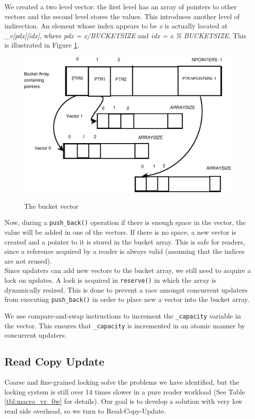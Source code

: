 \documentclass[a4paper,marginparwidth=50pt,marginparsep=10pt]{article}
\begin{document}
We created a two level vector: the first level has an array of pointers to other vectors and the second level stores the values. This introduces another level of indirection. An element whose index appears to be \emph{x} is actually located at \emph{\_v[pdx][idx]}, where \emph{pdx = x/BUCKETSIZE} and \emph{idx = x \% BUCKETSIZE}. This is illustrated in Figure \ref{bucketvector}. 
\begin{figure}[tph]
\includegraphics[scale = 0.4]{../images/diagrams/bucketvector.eps}
\label{bucketvector}
\caption{The bucket vector}
\end{figure}
Now, during a \verb+push_back()+ operation if there is enough space in the vector, the value will be added in one of the vectors. If there is no space, a new vector is created and a pointer to it is stored in the bucket array. This is safe for readers, since a reference acquired by a reader is always valid (assuming that the indices are not reused).\\

Since updaters can add new vectors to the bucket array, we still need to acquire a lock on updates. A lock is acquired in \verb+reserve()+ in which the array is dynamically resized. This is done to prevent a race amongst concurrent updaters from executing \verb+push_back()+ in order to place new a vector into the bucket array.

We use compare-and-swap instructions to increment the \verb+_capacity+ variable in the vector. This ensures that \verb+_capacity+ is incremented in an atomic manner by concurrent updaters.
\subsection{Read Copy Update}
\label{sec:rcu}
Coarse and fine-grained locking solve the problems we have identified, but the locking system is still over 14 times slower in a pure reader workload (See Table \ref{tbl:macro_vr_0w} for details). Our goal is to develop a solution with very low read side overhead, so we turn to Read-Copy-Update.\\
\end{document}
